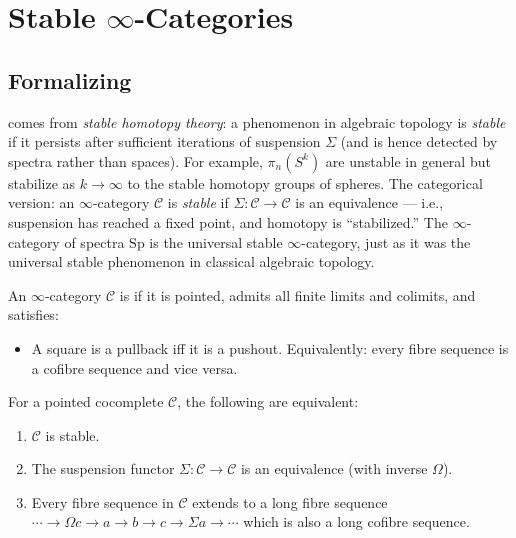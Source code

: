 \section{Stable $\infty$-Categories}
\label{sec:stable-qcat}

\subsection{Formalizing}

\begin{nameorigin}
 comes from \emph{stable homotopy theory}: a phenomenon in
algebraic topology is \emph{stable} if it persists after sufficient
iterations of suspension $\Sigma$ (and is hence detected by spectra
rather than spaces). For example, $\pi_n(S^k)$ are unstable in general
but stabilize as $k \to \infty$ to the stable homotopy groups of spheres.
The categorical version: an $\infty$-category $\mathcal{C}$ is
\emph{stable} if $\Sigma : \mathcal{C} \to \mathcal{C}$ is an
equivalence — i.e., suspension has reached a fixed point, and homotopy
is ``stabilized.'' The $\infty$-category of spectra $\mathrm{Sp}$ is
the universal stable $\infty$-category, just as it was the universal
stable phenomenon in classical algebraic topology.
\end{nameorigin}

\begin{definition}
\label{def:stable-qcat}
An $\infty$-category $\mathcal{C}$ is  if it is pointed,
admits all finite limits and colimits, and satisfies:
\begin{itemize}
  \item A square is a pullback iff it is a pushout. Equivalently:
        every fibre sequence is a cofibre sequence and vice versa.
\end{itemize}
\end{definition}

\begin{theorem}
\label{thm:stable-equiv}
For a pointed cocomplete $\mathcal{C}$, the following are equivalent:
\begin{enumerate}
  \item $\mathcal{C}$ is stable.
  \item The suspension functor $\Sigma : \mathcal{C} \to \mathcal{C}$ is
        an equivalence (with inverse $\Omega$).
  \item Every fibre sequence in $\mathcal{C}$ extends to a long fibre
        sequence
        $\cdots \to \Omega c \to a \to b \to c \to \Sigma a \to \cdots$
        which is also a long cofibre sequence.
\end{enumerate}
\end{theorem}


